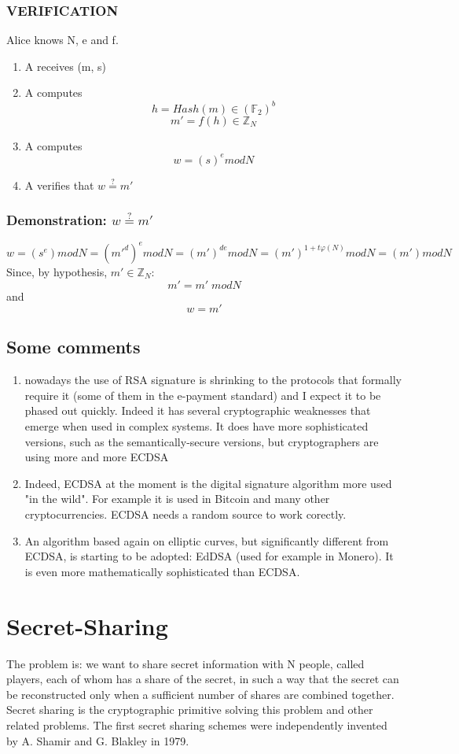 \documentclass[a4paper, 10pt, titlepage]{article}
\begin{document}
\subsubsection*{VERIFICATION}
Alice knows N, e and f.
\begin{enumerate}
\item A receives (m, s)
\item A computes
$$h = Hash(m) \in (\mathbb{F}_2)^b$$
$$m' = f(h) \in \mathbb{Z}_N$$
\item A computes
$$w = (s)^e mod N$$
\item A verifies that $w \stackrel{?}= m'$
\end{enumerate}

\subsubsection*{Demonstration: $w \stackrel{?}= m'$}
$$w = (s^e) mod N
= (m'^d)^e mod N
= (m')^{de} mod N
= (m')^{1+t\varphi(N)} mod N
= (m') mod N$$
Since, by hypothesis, $m' \in \mathbb{Z}_N$:
$$m' = m' \; mod N$$
and
$$w = m'$$
\subsection{Some comments}
\begin{enumerate}
\item nowadays the use of RSA signature is shrinking to the protocols that formally require it (some of them in the e-payment standard) and I expect it to be phased out quickly. Indeed it has several cryptographic weaknesses that emerge when used in complex systems. It does have more sophisticated versions, such as the semantically-secure versions, but cryptographers are using more and more ECDSA
\item Indeed, ECDSA at the moment is the digital signature algorithm more used "in the wild". For example it is used in Bitcoin and many other cryptocurrencies. ECDSA needs a random source to work corectly.
\item An algorithm based again on elliptic curves, but significantly different from ECDSA, is starting to be adopted: EdDSA (used for example in Monero). It is even more mathematically sophisticated than ECDSA.
\end{enumerate}

\newpage
\section{Secret-Sharing}
The problem is: we want to share secret information with N people, called players, each of whom has a share of the secret, in such a way that the secret can be reconstructed only when a sufficient number of shares are combined together.
Secret sharing is the cryptographic primitive solving this problem and other related problems. The first secret sharing schemes were independently invented by A. Shamir and G. Blakley in 1979.
\end{document}
